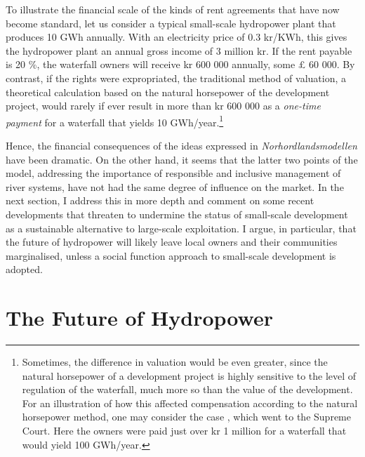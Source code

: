To illustrate the financial scale of the kinds of rent agreements that have now become standard, let us consider a typical small-scale hydropower plant that produces 10 GWh annually. With an electricity price of 0.3 kr/KWh, this gives the hydropower plant an annual gross income of 3 million kr. If the rent payable is 20 \%, the waterfall owners will receive kr 600 000 annually, some £ 60 000. By contrast, if the rights were expropriated, the traditional method of valuation, a theoretical calculation based on the natural horsepower of the development project, would rarely if ever result in more than kr 600 000 as a {\it one-time payment} for a waterfall that yields 10 GWh/year.\footnote{Sometimes, the difference in valuation would be even greater, since the natural horsepower of a development project is highly sensitive to the level of regulation of the waterfall, much more so than the value of the development. For an illustration of how this affected compensation according to the natural horsepower method, one may consider the case \cite{hellandsfoss97}, which went to the Supreme Court. Here the owners were paid just over kr 1 million for a waterfall that would yield 100 GWh/year.}

Hence, the financial consequences of the ideas expressed in {\it Norhordlandsmodellen} have been dramatic. On the other hand, it seems that the latter two points of the model, addressing the importance of responsible and inclusive management of river systems, have not had the same degree of influence on the market. In the next section, I address this in more depth and comment on some recent developments that threaten to undermine the status of small-scale development as a sustainable alternative to large-scale exploitation. I argue, in particular, that the future of hydropower will likely leave local owners and their communities marginalised, unless a social function approach to small-scale development is adopted.

\section{The Future of Hydropower}\label{sec:future}

